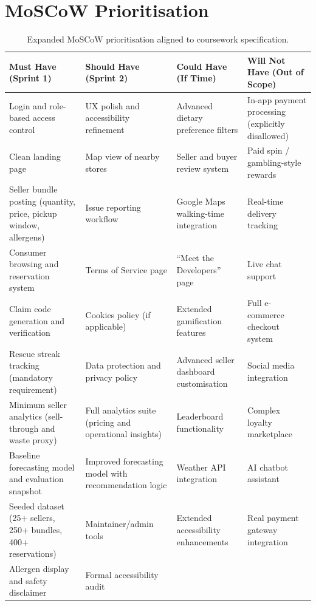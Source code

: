 \documentclass[11pt, a4paper]{report}
\begin{document}
\section{MoSCoW Prioritisation}
\renewcommand{\arraystretch}{1.25}
\begin{table}[H]
\centering
\begin{tabular}{|p{3.4cm}|p{3.4cm}|p{3.4cm}|p{3.4cm}|}
\hline
\textbf{Must Have (Sprint 1)} &
\textbf{Should Have (Sprint 2)} &
\textbf{Could Have (If Time)} &
\textbf{Will Not Have (Out of Scope)} \\
\hline
Login and role-based access control &
UX polish and accessibility refinement &
Advanced dietary preference filters &
In-app payment processing (explicitly disallowed) \\
\hline
Clean landing page &
Map view of nearby stores &
Seller and buyer review system &
Paid spin / gambling-style rewards \\
\hline
Seller bundle posting (quantity, price, pickup window, allergens) &
Issue reporting workflow &
Google Maps walking-time integration &
Real-time delivery tracking \\
\hline
Consumer browsing and reservation system &
Terms of Service page &
“Meet the Developers” page &
Live chat support \\
\hline
Claim code generation and verification &
Cookies policy (if applicable) &
Extended gamification features &
Full e-commerce checkout system \\
\hline
Rescue streak tracking (mandatory requirement) &
Data protection and privacy policy &
Advanced seller dashboard customisation &
Social media integration \\
\hline
Minimum seller analytics (sell-through and waste proxy) &
Full analytics suite (pricing and operational insights) &
Leaderboard functionality &
Complex loyalty marketplace \\
\hline
Baseline forecasting model and evaluation snapshot &
Improved forecasting model with recommendation logic &
Weather API integration &
AI chatbot assistant \\
\hline
Seeded dataset (25+ sellers, 250+ bundles, 400+ reservations) &
Maintainer/admin tools &
Extended accessibility enhancements &
Real payment gateway integration \\
\hline
Allergen display and safety disclaimer &
Formal accessibility audit &
&
\\
\hline
\end{tabular}
\caption{Expanded MoSCoW prioritisation aligned to coursework specification.}
\end{table}
\FloatBarrier
\clearpage
\end{document}
